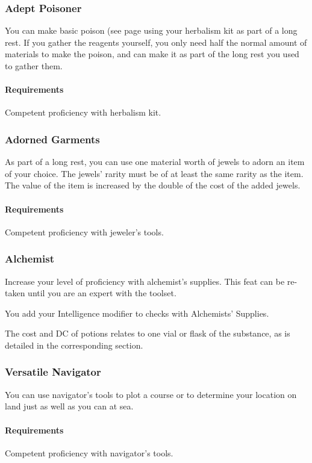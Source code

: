 \subsubsection{Adept Poisoner} \label{feat::adeptpoisoner}
    You can make basic poison (see page \pageref{item::basicpoison} using your herbalism kit as part of a long rest.
    If you gather the reagents yourself, you only need half the normal amount of materials to make the poison, and can make it as part of the long rest you used to gather them.
    \paragraph{Requirements} Competent proficiency with herbalism kit.
\subsubsection{Adorned Garments} \label{feat::adornedgarments}
    As part of a long rest, you can use one material worth of jewels to adorn an item of your choice.
    The jewels' rarity must be of at least the same rarity as the item.
    The value of the item is increased by the double of the cost of the added jewels.
    \paragraph{Requirements} Competent proficiency with jeweler's tools.
\subsubsection{Alchemist} \label{feat::alchemist}
    Increase your level of proficiency with alchemist's supplies.
    This feat can be re-taken until you are an expert with the toolset.

    You add your Intelligence modifier to checks with Alchemists' Supplies.

    The cost and DC of potions relates to one vial or flask of the substance, as is detailed in the corresponding section.
\subsubsection{Versatile Navigator} \label{feat::versatilenavigator}
    You can use navigator's tools to plot a course or to determine your location on land just as well as you can at sea.
    \paragraph{Requirements} Competent proficiency with navigator's tools.

